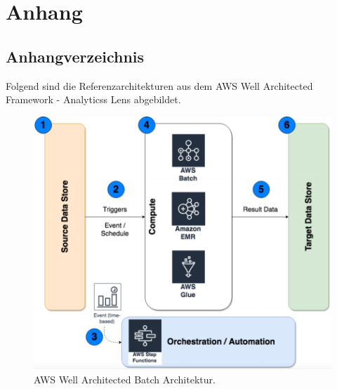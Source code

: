 \chapter*{Anhang}
\section*{Anhangverzeichnis}
\vspace{-8em}

\abstaendeanhangverzeichnis

\listofanhang
\clearpage
{} %








\pagebreak

\pagebreak

\pagebreak

Folgend sind die Referenzarchitekturen aus dem \ac{AWS} Well Architected Framework - Analyticss Lens abgebildet.
\begin{figure}[H]
\centering
\includegraphics[width=\textwidth]{graphics/AWS-Batch-Architecture.pdf}
\caption[AWS Well Architected Batch Architektur]{AWS Well Architected Batch Architektur.\footnotemark}
\label{abb:AWSWellArchitectedBatch}
\end{figure}

